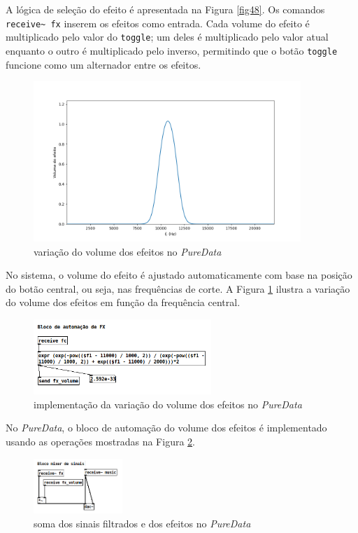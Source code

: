 A lógica de seleção do efeito é apresentada na Figura \ref{fig48}. Os comandos \texttt{receive\textasciitilde\ fx} inserem os efeitos como entrada. Cada volume do efeito é multiplicado pelo valor do \texttt{toggle}; um deles é multiplicado pelo valor atual enquanto o outro é multiplicado pelo inverso, permitindo que o botão \texttt{toggle} funcione como um alternador entre os efeitos.


\begin{figure}[h]
    \centering
    \includegraphics[width=0.9\textwidth]{figuras/fig49.png}
    \caption{variação do volume dos efeitos no \textit{PureData}}
    \label{fig49}
\end{figure}

No sistema, o volume do efeito é ajustado automaticamente com base na posição do botão central, ou seja, nas frequências de corte. A Figura \ref{fig49} ilustra a variação do volume dos efeitos em função da frequência central.

\begin{figure}[h]
    \centering
    \includegraphics[width=0.6\textwidth]{figuras/fig50.png}
    \caption{implementação da variação do volume dos efeitos no \textit{PureData}}
    \label{fig50}
\end{figure}

\newpage
No \textit{PureData}, o bloco de automação do volume dos efeitos é implementado usando as operações mostradas na Figura \ref{fig50}.

\begin{figure}[h]
    \centering
    \includegraphics[width=0.3\textwidth]{figuras/fig51.png}
    \caption{soma dos sinais filtrados e dos efeitos no \textit{PureData}}
    \label{fig51}
\end{figure}

